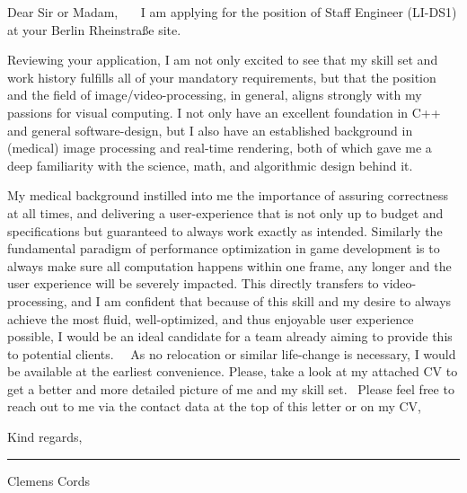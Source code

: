 \documentclass[11pt]{article}
\newcommand{\muted}{\color{muted_grey}}
\newcommand{\emptyline}{\,\newline}
\begin{document}
\begin{flushleft}
Dear Sir or Madam,
\emptyline
\emptyline
\emptyline
I am applying for the position of Staff Engineer (LI-DS1) at your Berlin Rheinstra{\ss}e site.\linebreak

Reviewing your application, I am not only excited to see that my skill set and work history fulfills all of your mandatory requirements, but that the position and the field of image/video-processing, in general, aligns strongly with my passions for visual computing.\linebreak
I not only have an excellent foundation in C++ and general software-design, but I also have an established background in (medical) image processing and real-time rendering, both of which gave me a deep familiarity with the science, math, and algorithmic design behind it. \linebreak

My medical background instilled into me the importance of assuring correctness at all times, and delivering a user-experience that is not only up to budget and specifications but guaranteed to always work exactly as intended.\linebreak
Similarly the fundamental paradigm of performance optimization in game development is to always make sure all computation happens within one frame, any longer and the user experience will be severely impacted.
This directly transfers to video-processing, and I am confident that because of this skill and my desire to always achieve the most fluid, well-optimized, and thus enjoyable user experience possible, I would be an ideal candidate for a team already aiming to provide this to potential clients.
\emptyline
\emptyline
As no relocation or similar life-change is necessary, I would be available at the earliest convenience.
Please, take a look at my attached CV to get a better and more detailed picture of me and my skill set.\linebreak
\emptyline
Please feel free to reach out to me via the contact data at the top of this letter or on my CV,

Kind regards,\newline
\emptyline
\emptyline
\emptyline
\emptyline

\rule[0pt]{30ex}{0.5pt}\newline
{\muted Clemens Cords}
\end{flushleft}
\end{document}
